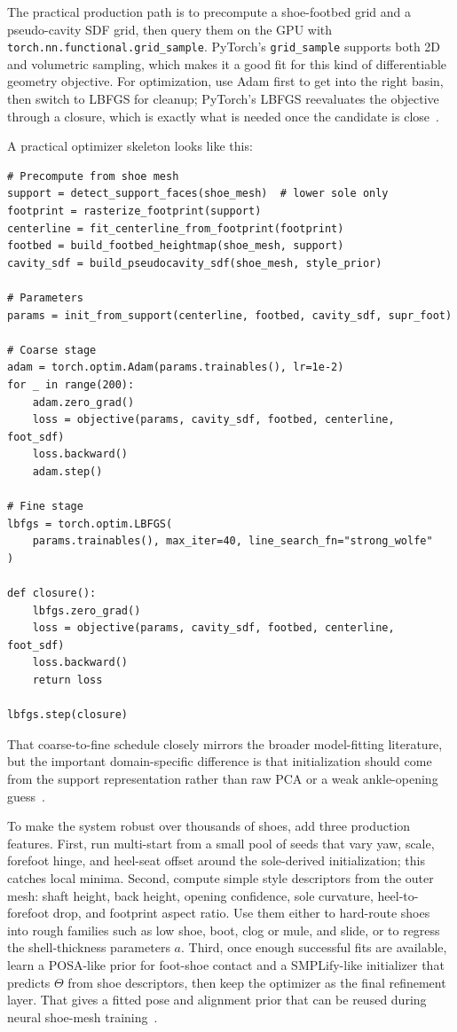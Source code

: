 \documentclass[11pt]{article}
\begin{document}
The practical production path is to precompute a shoe-footbed grid and a pseudo-cavity SDF grid, then query them on the GPU with \texttt{torch.nn.functional.grid\_sample}. PyTorch's \texttt{grid\_sample} supports both 2D and volumetric sampling, which makes it a good fit for this kind of differentiable geometry objective. For optimization, use Adam first to get into the right basin, then switch to LBFGS for cleanup; PyTorch's LBFGS reevaluates the objective through a closure, which is exactly what is needed once the candidate is close~\cite{grid-sample,adam,lbfgs}.

A practical optimizer skeleton looks like this:

\begin{lstlisting}[style=pythonstyle]
# Precompute from shoe mesh
support = detect_support_faces(shoe_mesh)  # lower sole only
footprint = rasterize_footprint(support)
centerline = fit_centerline_from_footprint(footprint)
footbed = build_footbed_heightmap(shoe_mesh, support)
cavity_sdf = build_pseudocavity_sdf(shoe_mesh, style_prior)

# Parameters
params = init_from_support(centerline, footbed, cavity_sdf, supr_foot)

# Coarse stage
adam = torch.optim.Adam(params.trainables(), lr=1e-2)
for _ in range(200):
    adam.zero_grad()
    loss = objective(params, cavity_sdf, footbed, centerline, foot_sdf)
    loss.backward()
    adam.step()

# Fine stage
lbfgs = torch.optim.LBFGS(
    params.trainables(), max_iter=40, line_search_fn="strong_wolfe"
)

def closure():
    lbfgs.zero_grad()
    loss = objective(params, cavity_sdf, footbed, centerline, foot_sdf)
    loss.backward()
    return loss

lbfgs.step(closure)
\end{lstlisting}

That coarse-to-fine schedule closely mirrors the broader model-fitting literature, but the important domain-specific difference is that initialization should come from the support representation rather than raw PCA or a weak ankle-opening guess~\cite{smplify,prox,contactopt}.

To make the system robust over thousands of shoes, add three production features. First, run multi-start from a small pool of seeds that vary yaw, scale, forefoot hinge, and heel-seat offset around the sole-derived initialization; this catches local minima. Second, compute simple style descriptors from the outer mesh: shaft height, back height, opening confidence, sole curvature, heel-to-forefoot drop, and footprint aspect ratio. Use them either to hard-route shoes into rough families such as low shoe, boot, clog or mule, and slide, or to regress the shell-thickness parameters $a$. Third, once enough successful fits are available, learn a POSA-like prior for foot-shoe contact and a SMPLify-like initializer that predicts $\Theta$ from shoe descriptors, then keep the optimizer as the final refinement layer. That gives a fitted pose and alignment prior that can be reused during neural shoe-mesh training~\cite{smplify,prox,posa}.
\end{document}
